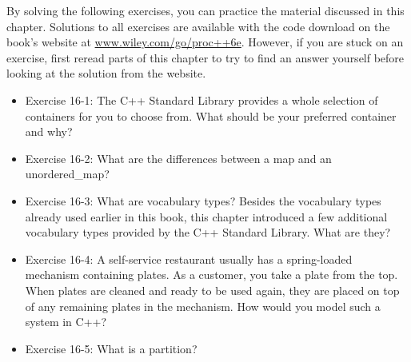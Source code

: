 By solving the following exercises, you can practice the material discussed in this chapter. Solutions to all exercises are available with the code download on the book’s website at \url{www.wiley.com/go/proc++6e}. However, if you are stuck on an exercise, first reread parts of this chapter to try to find an answer yourself before looking at the solution from the website.


\begin{itemize}
\item
Exercise 16-1: The C++ Standard Library provides a whole selection of containers for you to choose from. What should be your preferred container and why?

\item
Exercise 16-2: What are the differences between a map and an unordered\_map?

\item
Exercise 16-3: What are vocabulary types? Besides the vocabulary types already used earlier in this book, this chapter introduced a few additional vocabulary types provided by the C++ Standard Library. What are they?

\item
Exercise 16-4: A self-service restaurant usually has a spring-loaded mechanism containing plates. As a customer, you take a plate from the top. When plates are cleaned and ready to be used again, they are placed on top of any remaining plates in the mechanism. How would you model such a system in C++?

\item
Exercise 16-5: What is a partition?
\end{itemize}
